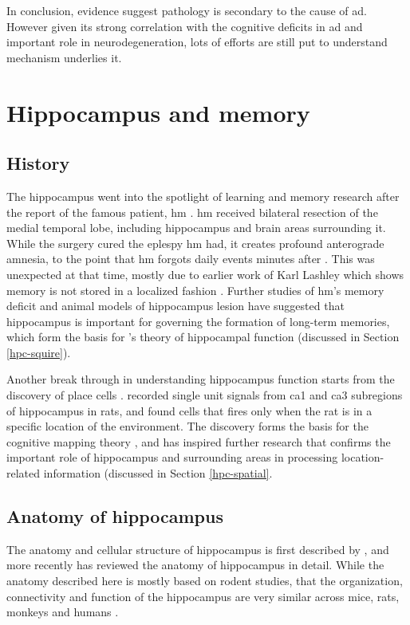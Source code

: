 In conclusion, evidence suggest \atau pathology is secondary to the cause of \gls{ad}. However given its strong correlation with the cognitive deficits in \gls{ad} and important role in neurodegeneration, lots of efforts are still put to understand mechanism underlies it. 

\section{Hippocampus and memory}
\subsection{History}
The hippocampus went into the spotlight of learning and memory research after the report of the famous patient, \gls{hm} \citep{scoville57, squire09}. \Gls{hm} received bilateral resection of the medial temporal lobe, including hippocampus and brain areas surrounding it. While the surgery cured the eplespy \gls{hm} had, it creates profound anterograde amnesia, to the point that \gls{hm} forgots daily events minutes after \citep{scoville57, squire09}. This was unexpected at that time, mostly due to earlier work of Karl Lashley which shows memory is not stored in a localized fashion \citep{bruce01}. Further studies of \gls{hm}'s memory deficit and animal models of hippocampus lesion have suggested that hippocampus is important for governing the formation of long-term memories, which form the basis for \citet{squire91}'s theory of hippocampal function (discussed in Section \ref{hpc-squire}).

Another break through in understanding hippocampus function starts from the discovery of place cells \citep{o'keefe71}. \citet{o'keefe71} recorded single unit signals from \gls{ca1} and \gls{ca3} subregions of hippocampus in rats, and found cells that fires only when the rat is in a specific location of the environment. The discovery forms the basis for the cognitive mapping theory \citep{o'keefe76}, and has inspired further research that confirms the important role of hippocampus and surrounding areas in processing location-related information (discussed in Section \ref{hpc-spatial}.


\subsection{Anatomy of hippocampus}
The anatomy and cellular structure of hippocampus is first described by \citet{cajal93}, and more recently \citet{strien09} has reviewed the anatomy of hippocampus in detail. While the anatomy described here is mostly based on rodent studies, that the organization, connectivity and function of the hippocampus are very similar across mice, rats, monkeys and humans \citep{clark13}. 

